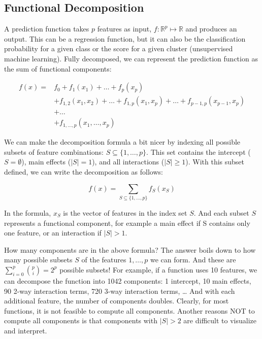 \documentclass[
  12pt,
]{krantz}
\begin{document}
\hypertarget{functional-decomposition}{%
\subsection{Functional Decomposition}\label{functional-decomposition}}

A prediction function takes \(p\) features as input, \(f: \mathbb{R}^p \mapsto \mathbb{R}\) and produces an output.
This can be a regression function, but it can also be the classification probability for a given class or the score for a given cluster (unsupervised machine learning).
Fully decomposed, we can represent the prediction function as the sum of functional components:

\begin{align*}f(x) = & f_0 + f_1(x_1) + \ldots + f_p(x_p) \\ & + f_{1,2}(x_1, x_2) + \ldots + f_{1,p}(x_1, x_p) + \ldots + f_{p-1,p}(x_{p-1}, x_p) \\  & + \ldots  \\ & +  f_{1,\ldots,p}(x_1, \ldots, x_p)\end{align*}

We can make the decomposition formula a bit nicer by indexing all possible subsets of feature combinations: \(S\subseteq\{1,\ldots,p\}\).
This set contains the intercept (\(S=\emptyset\)), main effects (\(|S|=1\)), and all interactions (\(|S|\geq{}1\)).
With this subset defined, we can write the decomposition as follows:

\[f(x) = \sum_{S\subseteq\{1,\ldots,p\}} f_S(x_S)\]

In the formula, \(x_S\) is the vector of features in the index set \(S\).
And each subset \(S\) represents a functional component, for example a main effect if S contains only one feature, or an interaction if \(|S| > 1\).

How many components are in the above formula?
The answer boils down to how many possible subsets \(S\) of the features \(1,\ldots, p\) we can form.
And these are \(\sum_{i=0}^p\binom{p}{i}=2^p\) possible subsets!
For example, if a function uses 10 features, we can decompose the function into 1042 components: 1 intercept, 10 main effects, 90 2-way interaction terms, 720 3-way interaction terms, \ldots{}
And with each additional feature, the number of components doubles.
Clearly, for most functions, it is not feasible to compute all components.
Another reasons NOT to compute all components is that components with \(|S|>2\) are difficult to visualize and interpret.
\end{document}
